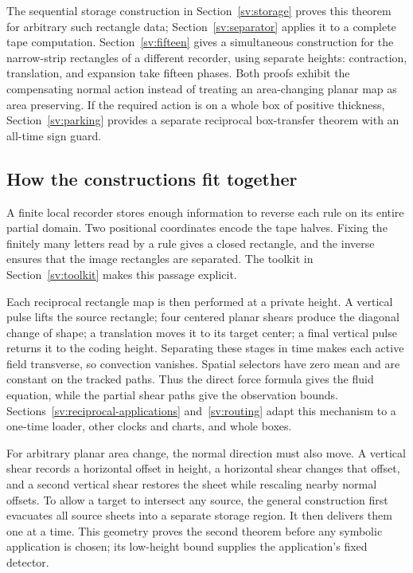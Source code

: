 The sequential storage construction in Section~\ref{sv:storage} proves
this theorem for arbitrary such rectangle data;
Section~\ref{sv:separator} applies it to a complete tape computation.
Section~\ref{sv:fifteen} gives a simultaneous construction for the
narrow-strip rectangles of a different recorder, using separate heights: contraction,
translation, and expansion take fifteen phases.  Both proofs exhibit the
compensating normal action instead of treating an area-changing planar
map as area preserving.  If the required action is on a whole box of
positive thickness, Section~\ref{sv:parking} provides a separate
reciprocal box-transfer theorem with an all-time sign guard.

\subsection{How the constructions fit together}
A finite local recorder stores enough information to reverse each rule
on its entire partial domain. Two positional coordinates encode the tape
halves. Fixing the finitely many letters read by a rule gives a closed
rectangle, and the inverse ensures that the image rectangles are
separated. The toolkit in Section~\ref{sv:toolkit} makes this passage
explicit.

Each reciprocal rectangle map is then performed at a private height.
A vertical pulse lifts the source rectangle; four centered planar shears
produce the diagonal change of shape; a translation moves it to its
target center; a final vertical pulse returns it to the coding height.
Separating these stages in time makes each active field transverse, so
convection vanishes. Spatial selectors have zero mean and are constant
on the tracked paths. Thus the direct force formula gives the fluid
equation, while the partial shear paths give the observation bounds.
Sections~\ref{sv:reciprocal-applications} and~\ref{sv:routing} adapt
this mechanism to a one-time loader, other clocks and charts, and whole
boxes.

For arbitrary planar area change, the normal direction must also move.
A vertical shear records a horizontal offset in height, a horizontal
shear changes that offset, and a second vertical shear restores the
sheet while rescaling nearby normal offsets. To allow a target to
intersect any source, the general construction first evacuates all
source sheets into a separate storage region. It then delivers them one
at a time. This geometry proves the second theorem before any symbolic
application is chosen; its low-height bound supplies the application's
fixed detector.

